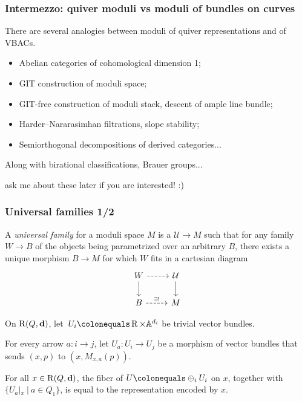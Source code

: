 \documentclass{beamer}
\begin{document}
\begin{frame}
    \frametitle{Intermezzo: quiver moduli vs moduli of bundles on curves}
There are several analogies between moduli of quiver representations and of VBACs. \pause

\begin{itemize}
    \item Abelian categories of cohomological dimension 1;
    \item GIT construction of moduli space;
    \item GIT-free construction of moduli stack, descent of ample line bundle;
    \item Harder--Nararasimhan filtrations, slope stability;
    \item Semiorthogonal decompositions of derived categories...
\end{itemize} \pause

Along with birational classifications, Brauer groups...\pause

{\tiny ask me about these later if you are interested! :)}

\end{frame}
\begin{frame}
    \frametitle{Universal families 1/2}
{\small
\begin{definition}
    A \emph{universal family} for a moduli space $M$ is a $\mathcal{U} \to M$
    such that for any family $W \to B$ of the objects being parametrized over an arbitrary $B$,
    there exists a unique morphism $B \to M$ for which $W$ fits in a cartesian diagram
\[
    \begin{tikzcd}[ampersand replacement=\&]
        W \arrow[d] \arrow[r, dashed] \& \mathcal{U} \arrow[d] \\
        B \arrow[r, dashed, "\exists!"] \& M
    \end{tikzcd}
\]
\end{definition}} \pause
On $\operatorname{R}(Q, \mathbf{d})$, let~$U_i \colonequals \parameterspace \times \mathbb{A}^{d_i}$
be trivial vector bundles. \pause

For every arrow $a : i \to j$, let $U_{a} : U_i \to U_j$ be a morphism of vector bundles that
sends $(x, p)$ to $(x, M_{x, a}(p))$. \pause

\begin{lemma}
For all $x \in \operatorname{R}(Q, \mathbf{d})$,
the fiber of $U \colonequals \oplus_i U_i$ on $x$,
together with $\{U_a|_{x}~|~ a \in Q_1\}$,
is equal to the representation encoded by $x$.
\end{lemma}
\end{frame}
\end{document}
